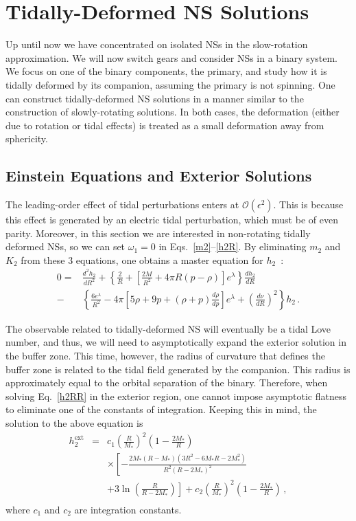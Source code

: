 \documentclass[aps,twocolumn,nofootinbib,showpacs,superscriptaddress,hyperref]{revtex4-1}
\newcommand\ba{\begin{eqnarray}}
\newcommand\ea{\end{eqnarray}}
\newcommand{\nn}{\nonumber}
\newcommand{\NS}{*}
\newcommand{\ext}{\mathrm{ext}}
\begin{document}
\section{Tidally-Deformed NS Solutions}
\label{sec:tidal}

Up until now we have concentrated on isolated NSs in the slow-rotation approximation. We will now switch gears and consider NSs in a binary system. We focus on one of the binary components, the primary, and study how it is tidally deformed by its companion, assuming the primary is not spinning. One can construct tidally-deformed NS solutions in a manner similar to the construction of slowly-rotating solutions. In both cases, the deformation (either due to rotation or tidal effects) is treated as a small deformation away from sphericity. 

\subsection{Einstein Equations and Exterior Solutions}

The leading-order effect of tidal perturbations enters at $\mathcal{O}(\epsilon^2)$. This is because this effect is generated by an electric tidal perturbation, which must be of even parity. Moreover, in this section we are interested in non-rotating tidally deformed NSs, so we can set $\omega_1=0$ in Eqs.~\eqref{m2}--\eqref{h2R}. By eliminating $m_2$ and $K_2$ from these 3 equations, one obtains a master equation for $h_2$~\cite{hinderer-love}:
%
\begin{align}
\label{h2RR}
0=& \frac{d^2 h_2}{dR^2} + \left\{ \frac{2}{R} + \left[ \frac{2M}{R^2} + 4 \pi R (p-\rho) \right] e^{\lambda} \right\} \frac{dh_2}{dR} \nn \\
-& \left\{ \frac{6 e^{\lambda}}{R^2} - 4\pi \left[ 5 \rho + 9p + (\rho+p) \frac{d\rho}{dp} \right] e^{\lambda} + \left( \frac{d\nu}{dR} \right)^2 \right\} h_2\,.
\end{align}
% 

The observable related to tidally-deformed NS will eventually be a tidal Love number, and thus, we will need to asymptotically expand the exterior solution in the buffer zone. This time, however, the radius of curvature that defines the buffer zone is related to the tidal field generated by the companion. This radius is approximately equal to the orbital separation of the binary. Therefore, when solving Eq.~\eqref{h2RR} in the exterior region, one cannot impose asymptotic flatness to eliminate one of the constants of integration. Keeping this in mind, the solution to the above equation is~\cite{hinderer-love}
%
\ba
h_2^\ext &=& c_1 \left( \frac{R}{M_\NS} \right)^2 \left( 1-\frac{2M_\NS}{R} \right) \nn \\
& & \times \left[ - \frac{2M_\NS (R-M_\NS) (3 R^2 - 6 M_\NS R - 2 M_\NS^2)}{R^2 (R-2M_\NS)^2} \right. \nn \\
& & \left. + 3 \ln \left( \frac{R}{R-2M_\NS} \right) \right] +c_2 \left( \frac{R}{M_\NS} \right)^2 \left( 1-\frac{2M_\NS}{R} \right)\,, \nn \\
\label{h2-ext-tides}
\ea
%
where $c_1$ and $c_2$ are integration constants. 
\end{document}
